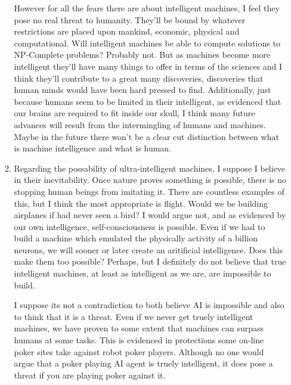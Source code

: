 \documentclass[11pt,fleqn]{article}
\begin{document}
\begin{enumerate}
\begin{enumerate}
However for all the fears there are about intelligent machines, I feel they pose no real threat to humanity. They'll be bound by whatever restrictions are placed upon mankind, economic, physical and computational. Will intelligent machines be able to compute solutions to NP-Complete problems? Probably not. But as machines become more intelligent they'll have many things to offer in terms of the sciences and I think they'll contribute to a great many discoveries, discoveries that human minds would have been hard pressed to find. Additionally, just because humans seem to be limited in their intelligent, as evidenced that our brains are required to fit inside our skull, I think many future advances will result from the intermingling of humans and machines. Maybe in the future there won't be a clear cut distinction between what is machine intelligence and what is human. 
\item 
Regarding the possability of ultra-intelligent machines, I suppose I believe in their inevitability. Once nature proves something is possible, there is no stopping human beings from imitating it. There are countless examples of this, but I think the most appropriate is flight. Would we be building airplanes if had never seen a bird? I would argue not, and as evidenced by our own intelligence, self-consciousness is possible. Even if we had to build a machine which emulated the physically activity of a billion neurons, we will sooner or later create an aritificial intelligence. Does this make them too possible? Perhaps, but I definitely do not believe that true intelligent machines, at least as intelligent as we are, are impossible to build. 

I suppose its not a contradiction to both believe AI is impossible and also to think that it is a threat. Even if we never get truely intelligent machines, we have proven to some extent that machines can surpass humans at some tasks. This is evidenced in protections some on-line poker sites take against robot poker players. Although no one would argue that a poker playing AI agent is truely intelligent, it does pose a threat if you are playing poker against it. 
\end{enumerate}

\end{enumerate}
\end{document}

